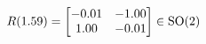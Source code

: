 \documentclass[preview]{standalone}
\begin{document}
\begin{align*}
\special{dvisvgm:raw <g id='unique000'>}R(1.59) = \begin{bmatrix} -0.01 & -1.00 \\ 1.00 & -0.01 \end{bmatrix} \in \text{SO}(2)\special{dvisvgm:raw </g>}
\end{align*}
\end{document}
